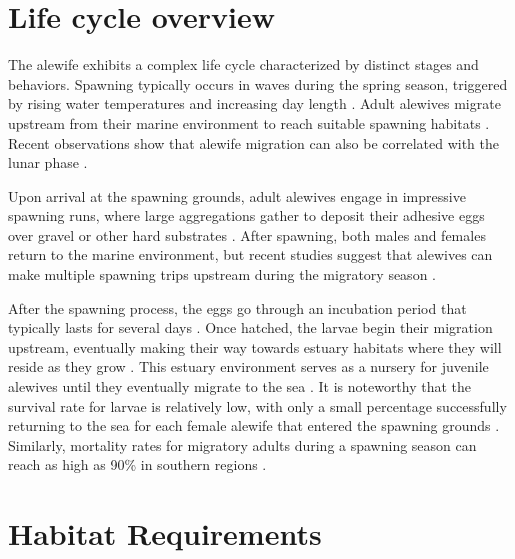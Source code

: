 \documentclass[
]{book}
\begin{document}
\hypertarget{life-cycle-overview}{%
\section{Life cycle overview}\label{life-cycle-overview}}

The alewife exhibits a complex life cycle characterized by distinct stages and behaviors. Spawning typically occurs in waves during the spring season, triggered by rising water temperatures and increasing day length \citep{asmfc_amendment_2009, able_alewife_2020}. Adult alewives migrate upstream from their marine environment to reach suitable spawning habitats \citep{bigelow_fishes_1953, bigelow_bigelow_2002}. Recent observations show that alewife migration can also be correlated with the lunar phase \citep{legett_daily_2021}.

Upon arrival at the spawning grounds, adult alewives engage in impressive spawning runs, where large aggregations gather to deposit their adhesive eggs over gravel or other hard substrates \citep{pardue_habitat_1983, janssen_preference_2004}. After spawning, both males and females return to the marine environment, but recent studies suggest that alewives can make multiple spawning trips upstream during the migratory season \citep{bigelow_fishes_1953, bigelow_bigelow_2002, mccartin_new_2019}.

After the spawning process, the eggs go through an incubation period that typically lasts for several days \citep{bigelow_fishes_1953, bigelow_bigelow_2002}. Once hatched, the larvae begin their migration upstream, eventually making their way towards estuary habitats where they will reside as they grow \citep{pardue_habitat_1983}. This estuary environment serves as a nursery for juvenile alewives until they eventually migrate to the sea \citep{kosa_processes_2001, laney_relationship_1997}. It is noteworthy that the survival rate for larvae is relatively low, with only a small percentage successfully returning to the sea for each female alewife that entered the spawning grounds \citep{kissil_spawning_1974}. Similarly, mortality rates for migratory adults during a spawning season can reach as high as 90\% in southern regions \citep{brady_part_2005}.

\hypertarget{habitat-requirements}{%
\section{Habitat Requirements}\label{habitat-requirements}}
\end{document}
